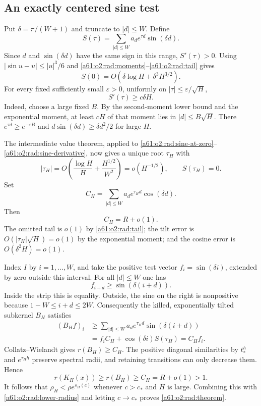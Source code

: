 \documentclass[11pt,letterpaper]{article}
\numberwithin{equation}{section}
\theoremstyle{remark}\newtheorem{remark}[theorem]{Remark}
\begin{document}
\subsection{An exactly centered sine test}

Put $\delta=\pi/(W+1)$ and truncate to $|d|\le W$. Define
\[
 S(\tau)=\sum_{|d|\le W}a_de^{\tau d}\sin(\delta d).
\]
Since $d$ and $\sin(\delta d)$ have the same sign in this range,
$S'(\tau)>0$. Using $|\sin u-u|\le|u|^3/6$ and
\eqref{a61:o2:rad:moments}--\eqref{a61:o2:rad:tail} gives
\begin{equation}\label{a61:o2:rad:sine-at-zero}
 S(0)=O(\delta\log H+\delta^3H^{3/2}).
\end{equation}
For every fixed sufficiently small $\varepsilon>0$, uniformly on
$|\tau|\le\varepsilon/\sqrt H$,
\begin{equation}\label{a61:o2:rad:sine-derivative}
 S'(\tau)\ge c\delta H.
\end{equation}
Indeed, choose a large fixed $B$. By the second-moment lower bound
and the exponential moment, at least $cH$ of that moment lies in
$|d|\le B\sqrt H$. There $e^{\tau d}\ge e^{-\varepsilon B}$ and
$d\sin(\delta d)\ge\delta d^2/2$ for large $H$.

The intermediate value theorem, applied to
\eqref{a61:o2:rad:sine-at-zero}--\eqref{a61:o2:rad:sine-derivative}, now gives a
unique root $\tau_H$ with
\begin{equation}\label{a61:o2:rad:tilt}
 |\tau_H|=O\left(\frac{\log H}{H}
                     +\frac{H^{1/2}}{W^2}\right)
          =o(H^{-1/2}),\qquad S(\tau_H)=0.
\end{equation}
Set
\[
 C_H=\sum_{|d|\le W}a_de^{\tau_Hd}\cos(\delta d).
\]
Then
\begin{equation}\label{a61:o2:rad:cosine-mass}
 C_H=R+o(1).
\end{equation}
The omitted tail is $o(1)$ by \eqref{a61:o2:rad:tail}; the tilt error is
$O(|\tau_H|\sqrt H)=o(1)$ by the exponential moment; and the cosine
error is $O(\delta^2H)=o(1)$.

Index $I$ by $i=1,\ldots,W$, and take the positive test vector
$f_i=\sin(\delta i)$, extended by zero outside this interval. For all
$|d|\le W$ one has
\[
 f_{i+d}\ge\sin(\delta(i+d)).
\]
Inside the strip this is equality. Outside, the sine on the right is
nonpositive because $1-W\le i+d\le2W$.
Consequently the killed, exponentially tilted subkernel $B_H$
satisfies
\begin{align*}
 (B_Hf)_i
 &\ge\sum_{|d|\le W}a_de^{\tau_Hd}\sin(\delta(i+d))\\
 &=f_iC_H+\cos(\delta i)S(\tau_H)=C_Hf_i.
\end{align*}
Collatz--Wielandt gives $r(B_H)\ge C_H$. The positive diagonal
similarities by $t_*^h$ and $e^{\tau_Hh}$ preserve spectral radii,
and retaining transitions can only decrease them. Hence
\[
 r(K_H(x))\ge r(B_H)\ge C_H=R+o(1)>1.
\]
It follows that $\rho_H<\rho e^{s_H(c)}$ whenever
$c>c_*$ and $H$ is large. Combining this with
\eqref{a61:o2:rad:lower-radius} and letting $c\to c_*$ proves
\eqref{a61:o2:rad:theorem}.
\end{document}
